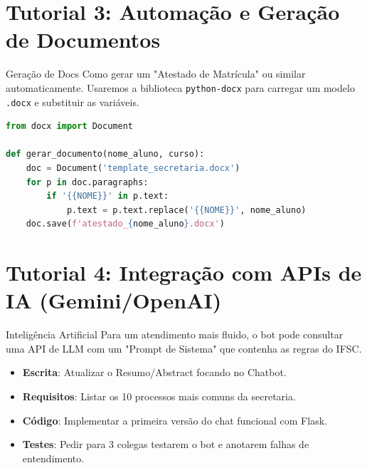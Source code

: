 \documentclass[12pt,a4paper]{article}
\begin{document}
\section{Tutorial 3: Automação e Geração de Documentos}
\begin{boxTutorial}{Geração de Docs}
Como gerar um "Atestado de Matrícula" ou similar automaticamente.
Usaremos a biblioteca \texttt{python-docx} para carregar um modelo \texttt{.docx} e substituir as variáveis.

\begin{lstlisting}[language=Python]
from docx import Document

def gerar_documento(nome_aluno, curso):
    doc = Document('template_secretaria.docx')
    for p in doc.paragraphs:
        if '{{NOME}}' in p.text:
            p.text = p.text.replace('{{NOME}}', nome_aluno)
    doc.save(f'atestado_{nome_aluno}.docx')
\end{lstlisting}
\end{boxTutorial}

\section{Tutorial 4: Integração com APIs de IA (Gemini/OpenAI)}
\begin{boxTutorial}{Inteligência Artificial}
Para um atendimento mais fluido, o bot pode consultar uma API de LLM com um "Prompt de Sistema" que contenha as regras do IFSC.
\end{boxTutorial}

\printbibliography[title={Referências}]

\newpage
\begin{boxDestaque}
\begin{itemize}
    \item[$\Box$] \textbf{Escrita}: Atualizar o Resumo/Abstract focando no Chatbot.
    \item[$\Box$] \textbf{Requisitos}: Listar os 10 processos mais comuns da secretaria.
    \item[$\Box$] \textbf{Código}: Implementar a primeira versão do chat funcional com Flask.
    \item[$\Box$] \textbf{Testes}: Pedir para 3 colegas testarem o bot e anotarem falhas de entendimento.
\end{itemize}
\end{boxDestaque}
\end{document}
